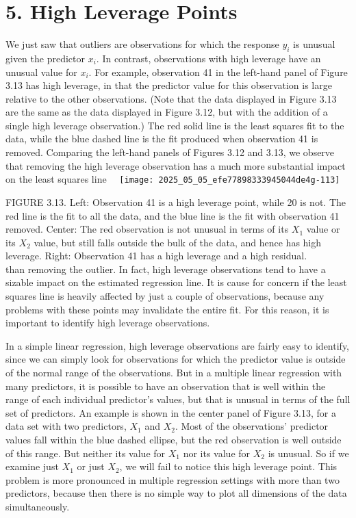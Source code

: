 \documentclass[10pt]{article}
\begin{document}
\section*{5. High Leverage Points}
We just saw that outliers are observations for which the response $y_{i}$ is unusual given the predictor $x_{i}$. In contrast, observations with high leverage have an unusual value for $x_{i}$. For example, observation 41 in the left-hand panel of Figure 3.13 has high leverage, in that the predictor value for this observation is large relative to the other observations. (Note that the data displayed in Figure 3.13 are the same as the data displayed in Figure 3.12, but with the addition of a single high leverage observation.) The red solid line is the least squares fit to the data, while the blue dashed line is the fit produced when observation 41 is removed. Comparing the left-hand panels of Figures 3.12 and 3.13, we observe that removing the high leverage observation has a much more substantial impact on the least squares line\
\
\texttt{[image: 2025\_05\_05\_efe77898333945044de4g-113]}

FIGURE 3.13. Left: Observation 41 is a high leverage point, while 20 is not. The red line is the fit to all the data, and the blue line is the fit with observation 41 removed. Center: The red observation is not unusual in terms of its $X_{1}$ value or its $X_{2}$ value, but still falls outside the bulk of the data, and hence has high leverage. Right: Observation 41 has a high leverage and a high residual.\\
than removing the outlier. In fact, high leverage observations tend to have a sizable impact on the estimated regression line. It is cause for concern if the least squares line is heavily affected by just a couple of observations, because any problems with these points may invalidate the entire fit. For this reason, it is important to identify high leverage observations.

In a simple linear regression, high leverage observations are fairly easy to identify, since we can simply look for observations for which the predictor value is outside of the normal range of the observations. But in a multiple linear regression with many predictors, it is possible to have an observation that is well within the range of each individual predictor's values, but that is unusual in terms of the full set of predictors. An example is shown in the center panel of Figure 3.13, for a data set with two predictors, $X_{1}$ and $X_{2}$. Most of the observations' predictor values fall within the blue dashed ellipse, but the red observation is well outside of this range. But neither its value for $X_{1}$ nor its value for $X_{2}$ is unusual. So if we examine just $X_{1}$ or just $X_{2}$, we will fail to notice this high leverage point. This problem is more pronounced in multiple regression settings with more than two predictors, because then there is no simple way to plot all dimensions of the data simultaneously.
\end{document}
